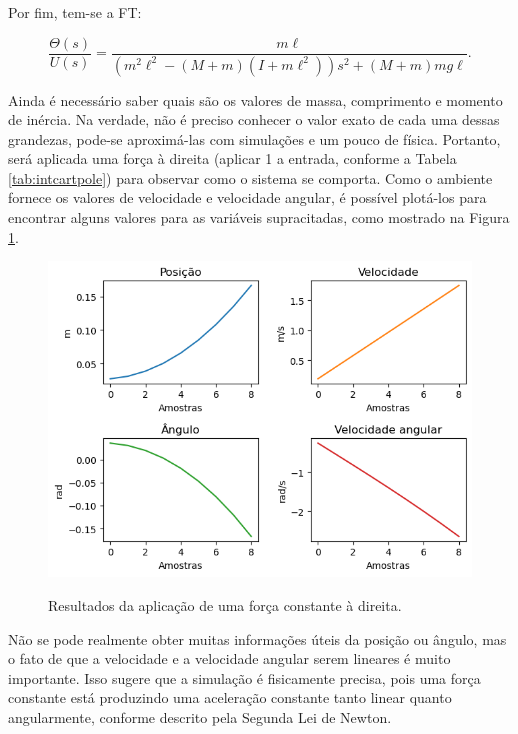 \documentclass[12pt,           %
a4paper,                       %
openany,                       %
oneside,                       %
chapter=TITLE,                 %
english,                       %
spanish,                       %
brazil,                        %
sumario=tradicional]{abntex2}  %
\begin{document}
\begin{OnehalfSpace}
Por fim, tem-se a FT:

\begin{equation}
    \frac{\Theta (s)}{U(s)} = \frac{m\ell}{(m^2\ell^2-(M+m)(I+m\ell^2))s^2+(M+m)mg\ell}.
    \label{eq:TF}
\end{equation}

Ainda é necessário saber quais são os valores de massa, comprimento e momento de inércia. Na verdade, não é preciso conhecer o valor exato de cada uma dessas grandezas, pode-se aproximá-las com simulações e um pouco de física. Portanto, será aplicada uma força à direita (aplicar 1 a entrada, conforme a Tabela \ref{tab:intcartpole}) para observar como o sistema se comporta. Como o ambiente fornece os valores de velocidade e velocidade angular, é possível plotá-los para encontrar alguns valores para as variáveis supracitadas, como mostrado na Figura \ref{fcte}.

\begin{figure}[H]
     \centering
     \vspace*{-0.2cm}
     \caption{Resultados da aplicação de uma força constante à direita.}
     \includegraphics[scale=.55]{Grafico1.png}
     \label{fcte}
\end{figure}
\vspace*{-0.8cm}
{\raggedright {}}

Não se pode realmente obter muitas informações úteis da posição ou ângulo, mas o fato de que a velocidade e a velocidade angular serem lineares é muito importante. Isso sugere que a simulação é fisicamente precisa, pois uma força constante está produzindo uma aceleração constante tanto linear quanto angularmente, conforme descrito pela Segunda Lei de Newton.



\end{OnehalfSpace}
\end{document}
